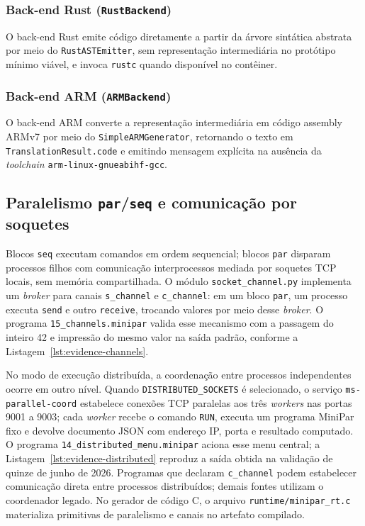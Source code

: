 \documentclass[12pt]{article}
\begin{document}
\subsubsection{Back-end Rust (\texttt{RustBackend})}
O back-end Rust emite código diretamente a partir da árvore sintática abstrata por meio do \texttt{RustASTEmitter}, sem representação intermediária no protótipo mínimo viável, e invoca \texttt{rustc} quando disponível no contêiner.

\subsubsection{Back-end ARM (\texttt{ARMBackend})}
O back-end ARM converte a representação intermediária em código assembly ARMv7 por meio do \texttt{SimpleARMGenerator}, retornando o texto em \texttt{TranslationResult.code} e emitindo mensagem explícita na ausência da \emph{toolchain} \texttt{arm-linux-gnueabihf-gcc}.

\subsection{Paralelismo \texttt{par}/\texttt{seq} e comunicação por soquetes}

Blocos \texttt{seq} executam comandos em ordem sequencial; blocos \texttt{par} disparam processos filhos com comunicação interprocessos mediada por soquetes TCP locais, sem memória compartilhada. O módulo \texttt{socket\_channel.py} implementa um \emph{broker} para canais \texttt{s\_channel} e \texttt{c\_channel}: em um bloco \texttt{par}, um processo executa \texttt{send} e outro \texttt{receive}, trocando valores por meio desse \emph{broker}. O programa \texttt{15\_channels.minipar} valida esse mecanismo com a passagem do inteiro 42 e impressão do mesmo valor na saída padrão, conforme a Listagem~\ref{lst:evidence-channels}.

No modo de execução distribuída, a coordenação entre processos independentes ocorre em outro nível. Quando \texttt{DISTRIBUTED\_SOCKETS} é selecionado, o serviço \texttt{ms-parallel-coord} estabelece conexões TCP paralelas aos três \emph{workers} nas portas 9001 a 9003; cada \emph{worker} recebe o comando \texttt{RUN}, executa um programa MiniPar fixo e devolve documento JSON com endereço IP, porta e resultado computado. O programa \texttt{14\_distributed\_menu.minipar} aciona esse menu central; a Listagem~\ref{lst:evidence-distributed} reproduz a saída obtida na validação de quinze de junho de 2026. Programas que declaram \texttt{c\_channel} podem estabelecer comunicação direta entre processos distribuídos; demais fontes utilizam o coordenador legado. No gerador de código C, o arquivo \texttt{runtime/minipar\_rt.c} materializa primitivas de paralelismo e canais no artefato compilado.
\end{document}

